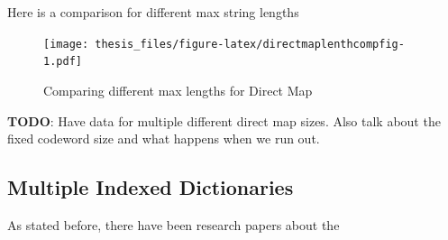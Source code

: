 \documentclass[12pt,twoside]{reedthesis}
\begin{document}
Here is a comparison for different max string lengths
\begin{figure}
\centering
\texttt{[image: thesis\_files/figure-latex/directmaplenthcompfig-1.pdf]}
\caption{\label{fig:directmaplenthcompfig}Comparing different max lengths for Direct Map}
\end{figure}
\textbf{TODO}: Have data for multiple different direct map sizes. Also talk about the fixed codeword size and what happens when we run out.

\hypertarget{multiple-indexed-dictionaries}{%
\subsection{Multiple Indexed Dictionaries}\label{multiple-indexed-dictionaries}}

As stated before, there have been research papers about the
\end{document}
